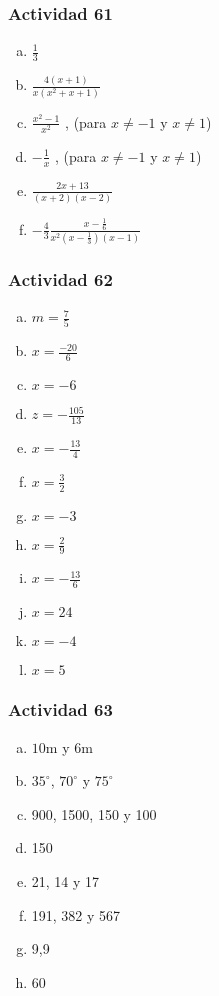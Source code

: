 \documentclass[a4paper, twocolumn]{article}
\begin{document}
\subsubsection*{Actividad 61}
\begin{enumerate}[a)]
\item $\frac{1}{3}$
\item $\frac{4(x+1)}{x(x^2+x+1)}$
\item $\frac{x^2 -1}{x^2}$ , (para $x \neq-1 $ y $ x\neq1$) 
\item $-\frac{1}{x}$ , (para $x \neq-1 $ y $x\neq1$)
\item $\frac{2x+13}{(x+2)(x-2)}$
\item $-\frac{4}{3}\frac{x-\frac{1}{6}}{x^2(x-\frac{1}{3})(x-1)}$
\end{enumerate}

\subsubsection*{Actividad 62}
\begin{enumerate}[a)]
\item $m=\frac{7}{5}$
\item $x=\frac{-20}{6}$
\item $x=-6$
\item $z=-\frac{105}{13}$
\item $x=-\frac{13}{4}$
\item $x=\frac{3}{2}$
\item $x=-3$
\item $x=\frac{2}{9}$
\item $x=-\frac{13}{6}$
\item $x=24$
\item $x=-4$
\item $x=5$
\end{enumerate}

\subsubsection*{Actividad 63}
\begin{enumerate}[a)]
\item $10\mathrm{m}$ y $6\mathrm{m}$
\item $35^\circ$, $70^\circ$ y $75^\circ$
\item 900, 1500, 150 y 100
\item 150
\item 21, 14 y 17
\item 191, 382 y 567
\item 9,9
\item 60
\end{enumerate}



\end{document}
